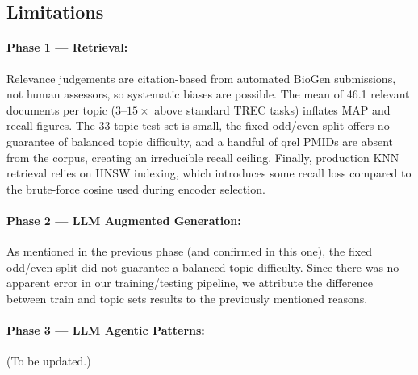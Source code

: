 \subsection{Limitations}
\label{sec:limitations}

\paragraph{Phase 1 --- Retrieval:}
Relevance judgements are citation-based from automated BioGen submissions,
not human assessors, so systematic biases are possible.
The mean of 46.1 relevant documents per topic
($3\text{--}15\times$ above standard TREC tasks) inflates MAP and recall
figures.
The 33-topic test set is small, the fixed odd/even split offers no guarantee
of balanced topic difficulty, and a handful of qrel PMIDs are absent from
the corpus, creating an irreducible recall ceiling.
Finally, production KNN retrieval relies on HNSW indexing, which introduces
some recall loss compared to the brute-force cosine used during encoder
selection.

\paragraph{Phase 2 --- LLM Augmented Generation:}
As mentioned in the previous phase (and confirmed in this one), the fixed odd/even split did not guarantee a balanced topic difficulty. Since there was no apparent error in our training/testing pipeline, we attribute the difference between train and topic sets results to the previously mentioned reasons.

\paragraph{Phase 3 --- LLM Agentic Patterns:} (To be updated.)
